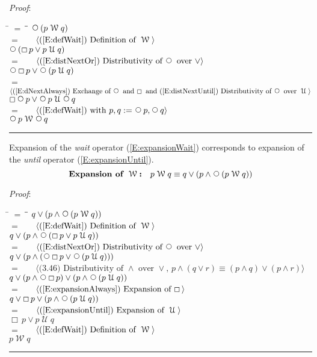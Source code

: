 \documentclass[12pt, fleqn, leqno]{article}
\newcommand{\lgap}{2pt}                             %
\newcommand{\mymathindent}{24pt}                    %
\newcommand{\Until}{\;\mathcal{U}\;}
\newcommand{\Wait}{\;\mathcal{W}\;}
\newcommand{\Next}{\;\,\text{\raisebox{3.5pt}{\circle{6}}}}
\newcommand{\Always}{\Box\,}
\newcommand{\myqed}{\rule[-.23ex]{1.2ex}{2.0ex}}
\newcommand{\myqedtab}{\hspace{384pt}}              %
\newcommand{\Gll} {\langle}                         %
\newcommand{\Ggg} {\rangle}                         %
\newcommand{\Hint}[1]     {\ \ \ $\Gll              \mbox{#1} \Ggg$ }   %
\begin{document}
\emph{Proof}:
\begin{tabbing}
\hspace{\mymathindent} \= $= \;$ \= \myqedtab \= \kill
\> \> $\Next (p \Wait q)$\\[\lgap]
\> $=$ \> \Hint{(\ref{E:defWait}) Definition of $\Wait$} \\[\lgap]
\> \> $\Next(\Always p\lor p\Until q)$\\[\lgap]
\> $=$ \> \Hint{(\ref{E:distNextOr}) Distributivity of $\Next$ over $\lor$} \\[\lgap]
\> \> $\Next \Always p\lor \Next(p\Until q)$\\[\lgap]
\> $=$ \> \Hint{(\ref{E:dNextAlways}) Exchange of $\Next$ and $\Always$ and (\ref{E:distNextUntil}) Distributivity of $\Next$ over $\Until$} \\[\lgap]
\> \> $\Always \Next p\lor \Next p\Until \Next q$\\[\lgap]
\> $=$ \> \Hint{(\ref{E:defWait}) with $p,q := \Next p, \Next q$} \\[\lgap]
\> \> $\Next p \Wait \Next q$ \quad \myqed
\end{tabbing}

Expansion of the \textit{wait} operator (\ref{E:expansionWait}) corresponds to expansion of the \textit{until} operator (\ref{E:expansionUntil}).
\begin{equation}\label{E:expansionWait}
\textbf{Expansion of $\Wait$:}\quad p \Wait q \equiv q \lor (p \land \Next (p \Wait q))
\end{equation}

\emph{Proof}:
\begin{tabbing}
\hspace{\mymathindent} \= $= \;$ \= \myqedtab \= \kill
\> \> $q \lor (p \land \Next (p \Wait q))$\\[\lgap]
\> $=$ \> \Hint{(\ref{E:defWait}) Definition of $\Wait$} \\[\lgap]
\> \> $q \lor (p \land \Next (\Always p\lor p \Until q))$\\[\lgap]
\> $=$ \> \Hint{(\ref{E:distNextOr}) Distributivity of $\Next$ over $\lor$} \\[\lgap]
\> \> $q \lor (p \land (\Next\Always p\lor \Next (p \Until q)))$\\[\lgap]
\> $=$ \> \Hint{(3.46) Distributivity of $\land$ over $\lor$, $p\land (q\lor r)\equiv (p\land q)\lor (p\land r)$}\\[\lgap]
\> \> $q \lor (p \land \Next\Always p)\lor (p \land \Next(p \Until q))$\\[\lgap]
\> $=$ \> \Hint{(\ref{E:expansionAlways}) Expansion of $\Always$}\\[\lgap]
\> \> $q \lor \Always p\lor (p \land \Next(p \Until q))$\\[\lgap]
\> $=$ \> \Hint{(\ref{E:expansionUntil}) Expansion of $\Until$}\\[\lgap]
\> \> $\Always p\lor p \Until q$\\[\lgap]
\> $=$ \> \Hint{(\ref{E:defWait}) Definition of $\Wait$} \\[\lgap]
\> \> $p \Wait q$ \quad \myqed
\end{tabbing}
\end{document}
